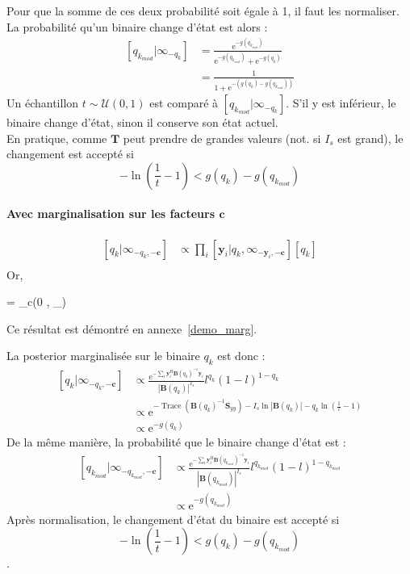 \documentclass[ 12pt]{article}
\renewenvironment{equation}{\vspace{-0.2cm}\begin{oldequation}}{\vspace{-0.2cm}\end{oldequation}}
\newcommand{\e}{\mathrm{e}}
\newcommand{\tr}[1]{\operatorname{Trace}\!\left(#1\right)}
\begin{document}
Pour que la somme de ces deux probabilité soit égale à 1, il faut les normaliser. La probabilité qu'un binaire change d'état est alors : 
\begin{align*}
	\left[q_{k_{mod}} | \infty_{-q_k}  \right] & =  \frac{ \e^{- g(q_{k_{mod}})}}{ \e^{- g(q_{k_{mod}})} +\e^{- g(q_{k})}}  \\[1ex]
	&\boxed{= \frac{1}{1 + \e^{- \left(g(q_{k}) -   g(q_{k_{mod}})\right)}}}
\end{align*}
Un échantillon $t \sim \mathcal{U}(0,1)$ est comparé à $\left[q_{k_{mod}} | \infty_{-q_k}  \right]$. S'il y est inférieur, le binaire change d'état, sinon il conserve son état actuel.\\
En pratique, comme $\bm{T}$ peut prendre de grandes valeurs (not. si $I_s$ est grand), le changement est accepté si $$-\ln\left(\frac{1}{t}-1\right) < g(q_{k}) -   g(q_{k_{mod}})$$


\paragraph{Avec marginalisation sur les facteurs $\bm{c}$}

\begin{align*}
	\left[q_k | \infty	_{-q_k,-\bm{c}}  \right] &\propto \prod_i  \left[ \bm{y}_i |q_k, \infty_{-\bm{y}_i,-\bm{c}} \right] [q_k]\\
\end{align*}
Or, 
\begin{equation}
         = _c(0 , _{})
\end{equation}
Ce résultat est démontré en annexe~\ref{demo_marg}.

La posterior marginalisée sur le binaire $q_k$ est donc : 
\begin{align*}
	\left[q_k | \infty	_{-q_k,-\bm{c}}  \right] &\propto \frac{\e^{ - \sum_i  \bm{y}_i^H \bm{B}(q_k)^{-1}\bm{y}_i  }}{|\bm{B}(q_k)|^{I_s}}  l^{q_k}(1-l)^{1-q_k}\\
	& \propto \e^{-\tr{ \bm{B}(q_k)^{-1}\bm{S}_{yy}} - I_s\ln|\bm{B}(q_k)| - q_k \ln\left( \frac{1}{l}-1 \right)}\\
	& \propto \e^{- g(q_k)}
\end{align*}
De la même manière, la probabilité que le binaire change d'état est : 
\begin{align*}
	\left[q_{k_{mod}} | \infty	_{-q_{k_{mod}} ,-\bm{c}}  \right] & \propto  \frac{\e^{ - \sum_i  \bm{y}_i^H \bm{B}(q_{k_{mod}})^{-1}\bm{y}_i  }}{|\bm{B}(q_{k_{mod}})|^{I_s}}  l^{q_{k_{mod}}}(1-l)^{1-q_{k_{mod}}}\\
	 & \propto \e^{- g(q_{k_{mod}})}
\end{align*}
Après normalisation, le changement d'état du binaire est accepté si $$-\ln\left(\frac{1}{t}-1\right) < g(q_{k}) -   g(q_{k_{mod}})$$.
\end{document}
